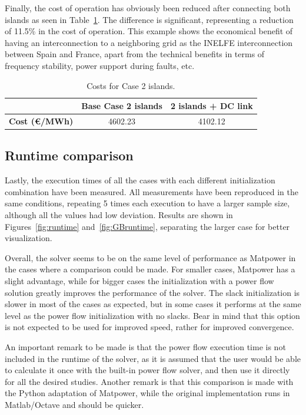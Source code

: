 Finally, the cost of operation has obviously been reduced after connecting both islands as seen in Table~\ref{tab:DC_cost}. The difference is significant, 
representing a reduction of 11.5\% in the cost of operation. This example shows the economical benefit of having an interconnection to a neighboring grid as the INELFE interconnection between 
Spain and France, apart from the technical benefits in terms of frequency stability, power support during faults, etc. 

\begin{table}[H]
    \centering
    \caption{Costs for Case 2 islands.}
    \begin{tabular}{lcc}
    \hline
     & {\textbf{Base Case 2 islands}}& {\textbf{2 islands + DC link}}\\ \hline\hline
    \textbf{Cost (€/MWh)} & 4602.23 & 4102.12 \\\hline
    \end{tabular}
    \label{tab:DC_cost}
\end{table}


\subsection{Runtime comparison}

Lastly, the execution times of all the cases with each different initialization combination have been measured. All measurements have been reproduced in the same conditions, repeating 5 times each execution to have a larger sample size, although
all the values had low deviation. Results are shown in Figures~\ref{fig:runtime} and~\ref{fig:GBruntime}, separating the larger case for better visualization. 

Overall, the solver seems to be on the same level of performance as Matpower in the cases where a comparison could be made. For smaller cases, Matpower has a slight advantage, while for bigger cases the initialization with a power flow solution
greatly improves the performance of the solver. The slack initialization is slower in most of the cases as expected, but in some cases it performs at the same level as the power flow initialization with no slacks. Bear in mind that this option is not
expected to be used for improved speed, rather for improved convergence.

An important remark to be made is that the power flow execution time is not included in the runtime of the solver, as it is assumed that the user would be able to calculate it once with the built-in power flow
solver, and then use it directly for all the desired studies. Another remark is that this comparison is made with the Python adaptation of Matpower, while the original implementation runs in Matlab/Octave and should be quicker.



